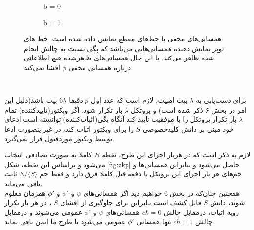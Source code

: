 \begin{figure}[H]
\centering
\begin{subfigure}[b]{0.4\linewidth}
\caption{b = 0}
\label{fig:sub1}

\end{subfigure}


\begin{subfigure}[b]{0.4\linewidth}
\caption{b = 1}
\label{fig:sub2}
	
\end{subfigure}%

	\caption{
			همسانی‌های مخفی با خط‌های مقطع نمایش داده شده است. خط های توپر نمایش دهنده همسانی‌هایی می‌باشد که پگی نسبت به چالش انجام شده ظاهر می‌کند. با این حال همسانی‌های ظاهرشده هیچ اطلاعاتی درباره همسانی مخفی
			$\phi$
			افشا نمی‌کند.	
	}
	\label{fig:challenge}
\end{figure}~

 برای دست‌یابی به 
$\lambda$
بیت امنیت، لازم است که عدد اول
$p$
دقیقا 
$6\lambda$
بیت باشد(دلیل این امر در بخش ۶ ذکر شده است) و پروتکل 
$\lambda$
بار تکرار شود. اگر ویکتور(تاییدکننده) تمام
$\lambda$
بار تکرار پروتکل را با موفقیت تایید کند آنگاه پگی(اثبات‌کننده) توانسته است ادعای خود مبنی بر دانش کلیدخصوصی
$S$
را برای ویکتور اثبات کند، در غیراینصورت ادعا توسط ویکتور موردقبول قرار نمی‌گیرد.


لازم به ذکر است که در هربار اجرای این طرح، نقطه
$R$
کاملا به صورت تصادفی انتخاب می‌شود و براساس این نقطه، شکل
\ref{fig:zkp}
حاصل می‌شود و بنابراین همسانی‌ها و خم‌های هر بار اجرای این پروتکل با دفعه قبل کاملا فرق دارد و فقط خم 
$E / \langle S \rangle $
ثابت باقی می‌ماند.
\\
 همچنین چنان‌‌که در بخش 
6
خواهیم دید اگر همسانی‌های 
$\psi$
و
${\psi}'$
و
${\phi}'$
همزمان معلوم شوند، دانش  
$S$
 قابل کشف است بنابراین برای جلوگیری از افشای 
$S$
، در هر بار تکرار رویه اثبات، درمقابل چالش 
 $ch = 0 $
 همسانی‌های 
 $\psi$
 و
 ${\phi}'$ 
 عمومی می‌شوند و درمقابل چالش
 $ch = 1$
 تنها همسانی 
 ${\phi}'$ 
 عمومی می‌شود تا طرح ما ایمن باقی بماند.
 
